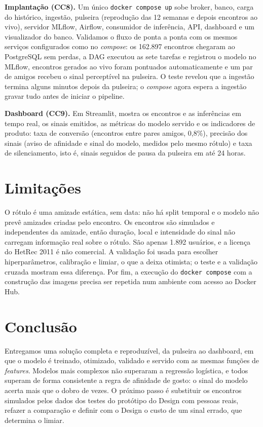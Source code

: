 \documentclass[12pt]{article}
\begin{document}
\textbf{Implantação (CC8).} Um único \texttt{docker compose up} sobe broker, banco, carga do histórico,
ingestão, pulseira (reprodução das 12 semanas e depois encontros ao vivo), servidor MLflow, Airflow,
consumidor de inferência, API, dashboard e um visualizador do banco. Validamos o fluxo de ponta a ponta
com os mesmos serviços configurados como no \emph{compose}: os 162.897 encontros chegaram ao PostgreSQL
sem perdas, a DAG executou as sete tarefas e registrou o modelo no MLflow, encontros gerados ao vivo
foram pontuados automaticamente e um par de amigos recebeu o sinal perceptível na pulseira. O teste
revelou que a ingestão termina alguns minutos depois da pulseira; o \emph{compose} agora espera a
ingestão gravar tudo antes de iniciar o pipeline.

\textbf{Dashboard (CC9).} Em Streamlit, mostra os encontros e as inferências em tempo real, os sinais
emitidos, as métricas do modelo servido e os indicadores de produto: taxa de conversão (encontros entre
pares amigos, 0,8\%), precisão dos sinais (aviso de afinidade e sinal do modelo, medidos pelo mesmo
rótulo) e taxa de silenciamento, isto é, sinais seguidos de pausa da pulseira em até 24 horas.

\section{Limitações}

O rótulo é uma amizade estática, sem data: não há split temporal e o modelo não prevê amizades criadas
pelo encontro. Os encontros são simulados e independentes da amizade, então duração, local e
intensidade do sinal não carregam informação real sobre o rótulo. São apenas 1.892 usuários, e a
licença do HetRec 2011 é não comercial. A validação foi usada para escolher hiperparâmetros, calibração
e limiar, o que a deixa otimista; o teste e a validação cruzada mostram essa diferença. Por fim, a
execução do \texttt{docker compose} com a construção das imagens precisa ser repetida num ambiente com
acesso ao Docker Hub.

\section{Conclusão}

Entregamos uma solução completa e reproduzível, da pulseira ao dashboard, em que o modelo é treinado,
otimizado, validado e servido com as mesmas funções de \emph{features}. Modelos mais complexos não
superaram a regressão logística, e todos superam de forma consistente a regra de afinidade de gosto:
o sinal do modelo acerta mais que o dobro de vezes. O próximo passo é substituir os encontros simulados
pelos dados dos testes do protótipo do Design com pessoas reais, refazer a comparação e definir com o
Design o custo de um sinal errado, que determina o limiar.



\end{document}
